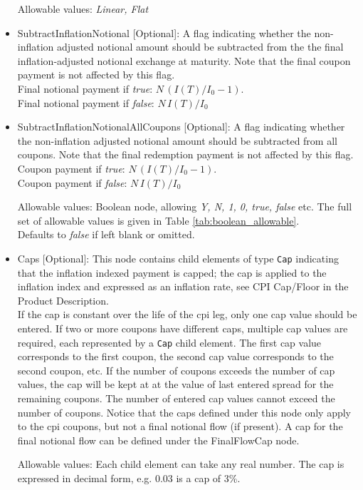 \begin{itemize}
Allowable values:  \emph{Linear, Flat} 

\item SubtractInflationNotional [Optional]: A flag indicating whether
  the non-inflation adjusted notional amount should be subtracted from
  the the final inflation-adjusted notional exchange at maturity.
  Note that the final coupon payment is not affected by this flag. \\ 
Final notional payment if \emph{true}: $N \,(I(T)/I_0-1)$. \\ 
Final notional payment if  \emph{false}: $N \,I(T)/I_0$ 

\item SubtractInflationNotionalAllCoupons [Optional]: A flag indicating whether
  the non-inflation adjusted notional amount should be subtracted from
  all coupons.
  Note that the final redemption payment is not affected by this flag. \\ 
Coupon payment if \emph{true}: $N \,(I(T)/I_0-1)$. \\ 
Coupon payment if  \emph{false}: $N \,I(T)/I_0$ 

Allowable values: Boolean node, allowing \emph{Y, N, 1, 0, true, false} etc. The full set of allowable values is given in Table \ref{tab:boolean_allowable}.
\\Defaults to \emph{false}  if left blank or omitted.

\item Caps [Optional]: This node contains child elements of type
  \lstinline!Cap! indicating that the inflation indexed payment is
  capped; the cap is applied to the inflation index and expressed as
  an inflation rate, see CPI Cap/Floor in the Product Description. \\
  If the cap is constant over the life of the 
cpi leg, only one cap value should
be entered. If two or more coupons have different caps, multiple cap values
are required, each represented by a \lstinline!Cap! child element. The first cap value
corresponds to the first coupon, the second cap value corresponds to the
second coupon, etc. If the number of coupons exceeds the number of cap
values, the cap will be kept at at the value of last entered spread for the
remaining coupons. The number of entered cap values cannot exceed the
number of coupons. Notice that the caps defined under this node only apply to the cpi coupons,
but not a final notional flow (if present). A cap for the final notional flow can be defined
under the FinalFlowCap node.

Allowable values: Each child element can take any real number. The cap is
expressed in decimal form, e.g. 0.03 is a cap of 3\%.


\end{itemize}
